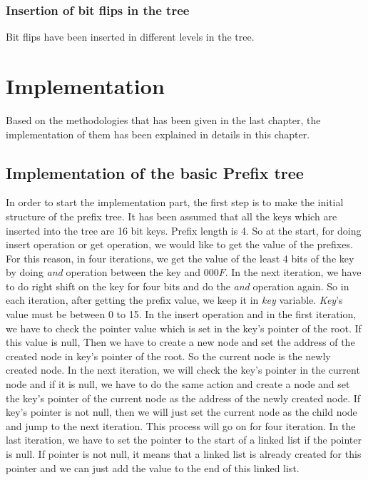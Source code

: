 \documentclass[12pt]{report}
\begin{document}
\subsection{Insertion of bit flips in the tree}

Bit flips have been inserted in different levels in the tree. 

\chapter{Implementation}

Based on the methodologies that has been given in the last chapter, the implementation of them has been explained in details in this chapter.

\section{Implementation of the basic Prefix tree}

In order to start the implementation part, the first step is to make the initial structure of the prefix tree. It has been assumed that all the keys which are inserted into the tree are 16 bit keys. Prefix length is 4. So at the start, for doing insert operation or get operation, we would like to get the value of the prefixes. For this reason, in four iterations, we get the value of the least 4 bits of the key by doing \textit{and} operation between the key and $000F$. In the next iteration, we have to do right shift on the key for four bits and do the \textit{and} operation again. So in each iteration, after getting the prefix value, we keep it in \textit{key} variable. \textit{Key}'s value must be between 0 to 15. In the insert operation and in the first iteration, we have to check the pointer value which is set in the key's pointer of the root. If this value is null, Then we have to create a new node and set the address of the created node in key's pointer of the root. So the current node is the newly created node. In the next iteration, we will check the key's pointer in the current node and if it is null, we have to do the same action and create a node and set the key's pointer of the current node as the address of the newly created node. If key's pointer is not null, then we will just set the current node as the child node and jump to the next iteration. This process will go on for four iteration. In the last iteration, we have to set the pointer to the start of a linked list if the pointer is null. If pointer is not null, it means that a linked list is already created for this pointer and we can just add the value to the end of this linked list.     
\end{document}
